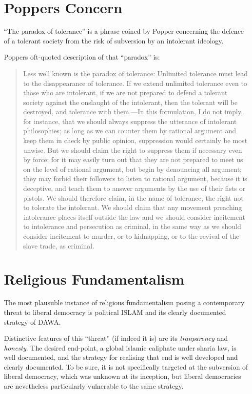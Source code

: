 \documentclass[10pt,titlepage]{book}
\begin{document}
\section{Poppers Concern}

``The paradox of tolerance'' is a phrase coined by Popper concerning the defence of a tolerant society from the risk of subversion by an intolerant ideology.

Poppers oft-quoted description of that ``paradox''  is:

\begin{quote}

Less well known is the paradox of tolerance: Unlimited tolerance must lead to the disappearance of tolerance. If we extend unlimited tolerance even to those who are intolerant, if we are not prepared to defend a tolerant society against the onslaught of the intolerant, then the tolerant will be destroyed, and tolerance with them.—In this formulation, I do not imply, for instance, that we should always suppress the utterance of intolerant philosophies; as long as we can counter them by rational argument and keep them in check by public opinion, suppression would certainly be most unwise. But we should claim the right to suppress them if necessary even by force; for it may easily turn out that they are not prepared to meet us on the level of rational argument, but begin by denouncing all argument; they may forbid their followers to listen to rational argument, because it is deceptive, and teach them to answer arguments by the use of their fists or pistols. We should therefore claim, in the name of tolerance, the right not to tolerate the intolerant. We should claim that any movement preaching intolerance places itself outside the law and we should consider incitement to intolerance and persecution as criminal, in the same way as we should consider incitement to murder, or to kidnapping, or to the revival of the slave trade, as criminal.

\end{quote}

\section{Religious Fundamentalism}

The most plausuble instance of religious fundamentalism posing a contemporary threat to liberal democracy is political ISLAM and its clearly documented strategy of DAWA.

Distinctive features of this ``threat'' (if indeed it is) are its \emph{tranparency} and \emph{honesty}.
The desired end-point, a global islamic caliphate under sharia law, is well documented, and the strategy for realising that end is well developed and clearly documented.
To be sure, it is not specifically targeted at the subversion of liberal democracy, which was unknown at its inception, but liberal democracies are nevetheless particularly vulnerable to the same strategy.
\end{document}
